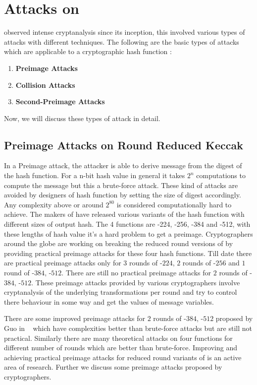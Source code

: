 \chapter{Attacks on \KECCAK{}}

\KECCAK{} observed intense cryptanalysis since its inception, this involved various types of attacks with different techniques. The following are the basic types of attacks which are applicable to a cryptographic hash function :

\begin{enumerate}
	\item \textbf{Preimage Attacks}
	\item \textbf{Collision Attacks}
	\item \textbf{Second-Preimage Attacks}
\end{enumerate}
Now, we will discuss these types of attack in detail.

\section{Preimage Attacks on Round Reduced Keccak}

In a Preimage attack, the attacker is able to derive message from the digest of the hash function. For a n-bit hash value in general it takes $2^{n}$ computations to compute the message but this a brute-force attack. These kind of attacks are avoided by designers of hash function by setting the size of digest accordingly. Any complexity above or around $2^{80}$ is considered computationally hard to achieve. The makers of \KECCAK{} have released various variants of the hash function  with different sizes of output hash. The 4  functions are -224, -256, -384 and -512, with these lengths of hash value it's a hard problem to get a preimage. Cryptographers around the globe are working on breaking the reduced round versions of \KECCAK{} by providing practical preimage attacks for these four  hash functions. Till date there are practical preimage attacks only for $3$ rounds of \KECCAK-$224$, $2$ rounds of \KECCAK-$256$ and $1$ round of \KECCAK-$384$, \KECCAK-$512$. There are still no practical preimage attacks for $2$ rounds of \KECCAK-$384$, \KECCAK-$512$. These preimage attacks provided by various cryptographers involve cryptanalysis of the underlying transformations per round and try to control there behaviour in some way and get the values of message variables.

There are some improved preimage attacks for $2$ rounds of \KECCAK-$384$, \KECCAK-$512$ proposed by Guo \etal in ~\cite{guo2016linear} which have complexities better than brute-force attacks but are still not practical. Similarly there are many theoretical attacks on four  functions for different number of rounds which are better than brute-force. Improving and achieving practical preimage attacks for reduced round variants of \KECCAK{} is an active area of research. Further we discuss some preimage attacks proposed by cryptographers.


